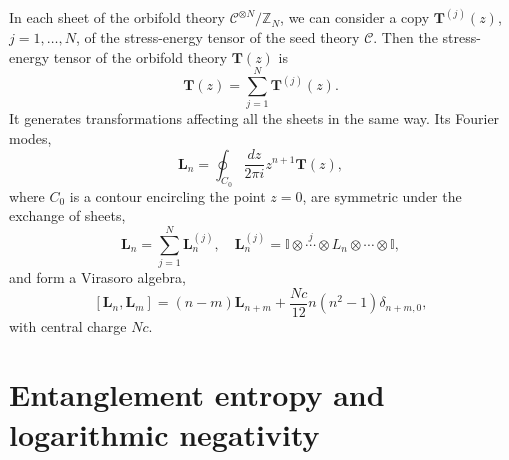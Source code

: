 \documentclass[a4paper,11pt]{article}
\begin{document}
In each sheet of the orbifold theory $\mathcal{C}^{\otimes N}/\mathbb{Z}_N$, we 
can consider a copy $\boldsymbol{T}^{(j)}(z)$, $j=1,\dots, N$, of the stress-energy tensor of 
the seed theory $\mathcal{C}$. Then the stress-energy tensor of the 
orbifold theory $\boldsymbol{T}(z)$ is 
\begin{equation}\label{hatT}
 \boldsymbol{T}(z)=\sum_{j=1}^N \boldsymbol{T}^{(j)}(z).
\end{equation}
It generates transformations affecting all the sheets in the same way. 
Its Fourier modes,
\begin{equation}
 \boldsymbol{L}_n=\oint_{C_0}\frac{dz}{2\pi i} z^{n+1}\boldsymbol{T}(z),
\end{equation}
where $C_0$ is a contour encircling the point $z=0$, are symmetric 
under the exchange of sheets, 
\begin{equation}
 \boldsymbol{L}_n=\sum_{j=1}^N \boldsymbol{L}_n^{(j)}, \quad 
 \boldsymbol{L}_n^{(j)}=\mathbb{I}\otimes \overset{j}{\cdots} \otimes L_{n}\otimes \cdots \otimes \mathbb{I},
\end{equation}
and form a Virasoro algebra, 
\begin{equation}\label{symm_virasoro_alg}
 [\boldsymbol{L}_n, \boldsymbol{L}_{m}]=(n-m)\boldsymbol{L}_{n+m}+\frac{Nc}{12}n(n^2-1)\delta_{n+m, 0},
\end{equation}
with central charge $Nc$.

\section{Entanglement entropy and logarithmic negativity}\label{app_ent}
\end{document}
